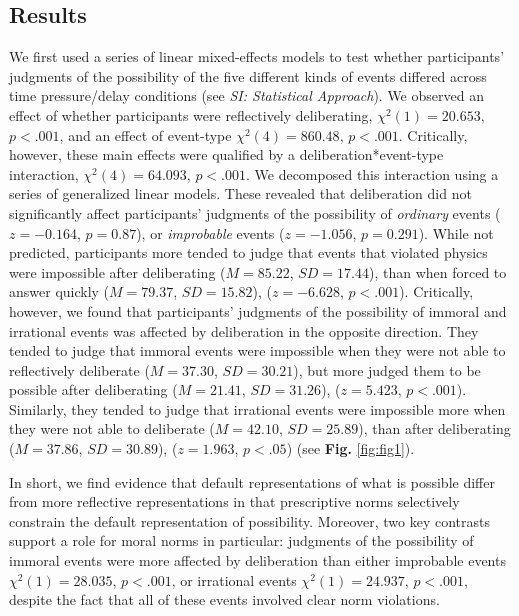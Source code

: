 \documentclass[9pt,twocolumn,twoside]{pnas-new}
\begin{document}
\subsection{Results} We first used a series of linear mixed-effects models to test whether participants' judgments of the possibility of the five different kinds of events differed across time pressure/delay conditions (see \textit{SI: Statistical Approach}). We observed an effect of whether participants were reflectively deliberating, $\chi^2(1) = 20.653$, $p < .001$, and an effect of event-type  $\chi^2(4) = 860.48$, $p < .001$. Critically, however, these main effects were qualified by a deliberation*event-type interaction, $\chi^2(4) = 64.093$, $p < .001$. We decomposed this interaction using a series of generalized linear models. These revealed that deliberation did not significantly affect participants' judgments of the possibility of \textit{ordinary} events ($z = -0.164$, $p = 0.87$), or \textit{improbable} events ($z = -1.056$, $p = 0.291$). While not predicted, participants more tended to judge that events that violated physics were impossible after deliberating ($M = 85.22$, $SD = 17.44$), than when forced to answer quickly ($M = 79.37$, $SD = 15.82$), ($z = -6.628$, $p < .001$). Critically, however, we found that participants' judgments of the possibility of immoral and irrational events was affected by deliberation in the opposite direction. They tended to judge that immoral events were impossible when they were not able to reflectively deliberate ($M = 37.30$, $SD = 30.21$), but more judged them to be possible after deliberating ($M = 21.41$, $SD = 31.26$), ($z = 5.423$, $p < .001$). Similarly, they  tended to judge that irrational events were impossible more when they were not able to deliberate ($M = 42.10$, $SD = 25.89$), than after deliberating ($M = 37.86$, $SD = 30.89$), ($z = 1.963$, $p < .05$) (see \textbf{Fig.} \ref{fig:fig1}).

In short, we find evidence that default representations of what is possible differ from more reflective representations in that prescriptive norms selectively constrain the default representation of possibility. Moreover, two key contrasts support a role for moral norms in particular: judgments of the possibility of immoral events were more affected by deliberation than either improbable events $\chi^2(1) = 28.035$, $p < .001$, or irrational events $\chi^2(1) = 24.937$, $p < .001$, despite the fact that all of these events involved clear norm violations.
\end{document}
